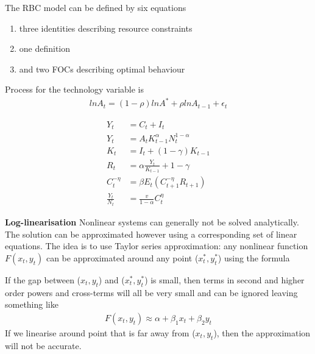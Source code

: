 \documentclass{beamer}
\begin{document}
\begin{frame}
  The RBC model can be defined by six equations
\begin{enumerate}
  \item three identities describing resource constraints
  \item one definition
  \item and two FOCs describing optimal behaviour
\end{enumerate}
Process for the technology variable is \begin{align}
  ln A_t = (1-\rho) ln A^* + \rho ln A_{t-1} + \epsilon_t
\end{align}
\end{frame}

\begin{frame}
\begin{align}
  Y_t &= C_t +I_t\\
  Y_t &= A_tK^{\alpha}_{t-1}N^{1-\alpha}_t\\
  K_t &= I_t+(1-\gamma)K_{t-1}\\
  R_t &= \alpha \frac{Y_t}{K_{t-1}}+1-\gamma\\
  C^{-\eta}_t &= \beta E_t(C^{-\eta}_{t+1}R_{t+1})\\
  \frac{Y_t}{N_t} &= \frac{v}{1-\alpha}C^{\eta}_t
\end{align}
\end{frame}

\begin{frame}
 \textbf{Log-linearisation}
 Nonlinear systems can generally not be solved analytically.
The solution can be approximated however using a corresponding set of linear equations.
The idea is to use Taylor series approximation: any nonlinear function $F(x_t,y_t)$ can be approximated around any point ($x^*_t,y^*_t$) using the formula

\end{frame}

\begin{frame}
  If the gap between ($x_t,y_t$) and ($x^*_t,y^*_t$) is small, then terms in second and higher order powers and cross-terms will all be very small and can be ignored leaving something like
\begin{align}
  F(x_t,y_t)\approx \alpha+\beta_1x_t+\beta_2y_t
\end{align}
If we linearise around point that is far away from ($x_t,y_t$), then the approximation will not be accurate.
\end{frame}
\end{document}
